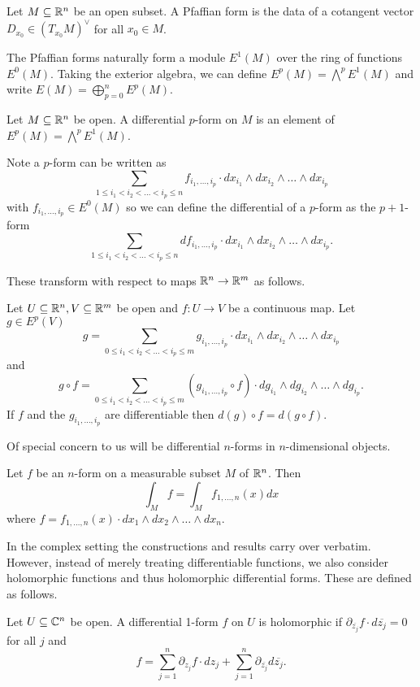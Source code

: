 \begin{definition}\label{def: Pfaffian form}
    Let $M\subseteq\mathbb{R}^{n}$ be an open subset. A Pfaffian form is the data of a cotangent vector $D_{x_{0}}\in (T_{x_{0}}M)^{\vee}$ for all $x_{0}\in M$. 
\end{definition}
The Pfaffian forms naturally form a module $E^{1}(M)$ over the ring of functions $E^{0}(M)$. Taking the exterior algebra, we can define $E^{p}(M)=\bigwedge^{p}E^{1}(M)$ and write $E(M)=\bigoplus_{p=0}^{n}E^{p}(M)$. 
\begin{definition}\label{def: differential p-form}
    Let $M\subseteq\mathbb{R}^{n}$ be open. A differential $p$-form on $M$ is an element of $E^{p}(M)=\bigwedge^{p}E^{1}(M)$.
\end{definition}
Note a $p$-form can be written as 
$$\sum_{1\leq i_{1}<i_{2}<\dots<i_{p}\leq n}f_{i_{1},\dots,i_{p}}\cdot dx_{i_{1}}\wedge dx_{i_{2}}\wedge\dots\wedge dx_{i_{p}}$$
with $f_{i_{1},\dots,i_{p}}\in E^{0}(M)$ so we can define the differential of a $p$-form as the $p+1$-form 
$$\sum_{1\leq i_{1}<i_{2}<\dots<i_{p}\leq n}df_{i_{1},\dots,i_{p}}\cdot dx_{i_{1}}\wedge dx_{i_{2}}\wedge\dots\wedge dx_{i_{p}}.$$

These transform with respect to maps $\mathbb{R}^{n}\to\mathbb{R}^{m}$ as follows. 
\begin{proposition}\label{prop: pullback of differential forms}
    Let $U\subseteq\mathbb{R}^{n},V\subseteq\mathbb{R}^{m}$ be open and $f:U\to V$ be a continuous map. Let $g\in E^{p}(V)$
    $$g=\sum_{0\leq i_{1}<i_{2}<\dots<i_{p}\leq m}g_{i_{1},\dots,i_{p}}\cdot dx_{i_{1}}\wedge dx_{i_{2}}\wedge\dots\wedge dx_{i_{p}}$$
    and 
    $$g\circ f=\sum_{0\leq i_{1}<i_{2}<\dots<i_{p}\leq m}(g_{i_{1},\dots,i_{p}}\circ f)\cdot dg_{i_{1}}\wedge dg_{i_{2}}\wedge\dots\wedge dg_{i_{p}}.$$
    If $f$ and the $g_{i_{1},\dots,i_{p}}$ are differentiable then $d(g)\circ f=d(g\circ f)$.
\end{proposition}
Of special concern to us will be differential $n$-forms in $n$-dimensional objects. 
\begin{definition}\label{def: integration over differential form}
    Let $f$ be an $n$-form on a measurable subset $M$ of $\mathbb{R}^{n}$. Then 
    $$\int_{M}f=\int_{M}f_{1,\dots,n}(x)dx$$
    where $f=f_{1,\dots,n}(x)\cdot dx_{1}\wedge dx_{2}\wedge\dots\wedge dx_{n}$. 
\end{definition}
In the complex setting the constructions and results carry over verbatim. However, instead of merely treating differentiable functions, we also consider holomorphic functions and thus holomorphic differential forms. These are defined as follows. 
\begin{definition}\label{def: holomorphic differential form}
    Let $U\subseteq\mathbb{C}^{n}$ be open. A differential 1-form $f$ on $U$ is holomorphic if $\partial_{\overline{z_{j}}}f\cdot d\overline{z_{j}}=0$ for all $j$ and 
    $$f=\sum_{j=1}^{n}\partial_{z_{j}}f\cdot dz_{j}+\sum_{j=1}^{n}\partial_{\overline{z_{j}}}d\overline{z_{j}}.$$
\end{definition}